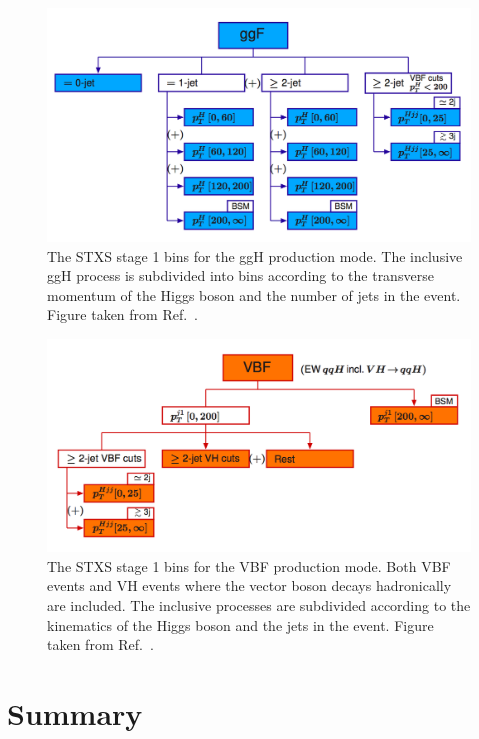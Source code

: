 \begin{figure}[hptb]
  \centering
  \includegraphics[width=\textwidth]{Figures/Theory/stage1ggH.png}
  \caption[Stage 1 STXS bins for the ggH production mode.]
  {
    The STXS stage 1 bins for the ggH production mode.
    The inclusive ggH process is subdivided into bins according to the transverse momentum 
    of the Higgs boson and the number of jets in the event.
    Figure taken from Ref.~\cite{YR4}.
  }
  \label{fig:theory_stage1ggH}
\end{figure}

\begin{figure}[hptb]
  \centering
  \includegraphics[width=\textwidth]{Figures/Theory/stage1VBF.png}
  \caption[Stage 1 STXS bins for the VBF production mode.]
  {
    The STXS stage 1 bins for the VBF production mode.
    Both VBF events and VH events where the vector boson decays hadronically are included.
    The inclusive processes are subdivided according to the kinematics of the Higgs boson 
    and the jets in the event.
    Figure taken from Ref.~\cite{YR4}.
  }
  \label{fig:theory_stage1VBF}
\end{figure}

\section{Summary}

